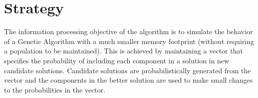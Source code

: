 \documentclass[a4paper, 11pt]{article}
\begin{document}

\section{Strategy}
\label{sec:strategy}
The information processing objective of the algorithm is to simulate the behavior of a Genetic Algorithm with a much smaller memory footprint (without requiring a population to be maintained). 
This is achieved by maintaining a vector that specifies the probability of including each component in a solution in new candidate solutions. Candidate solutions are probabilistically generated from the vector and the components in the better solution are used to make small changes to the probabilities in the vector.

\end{document}
